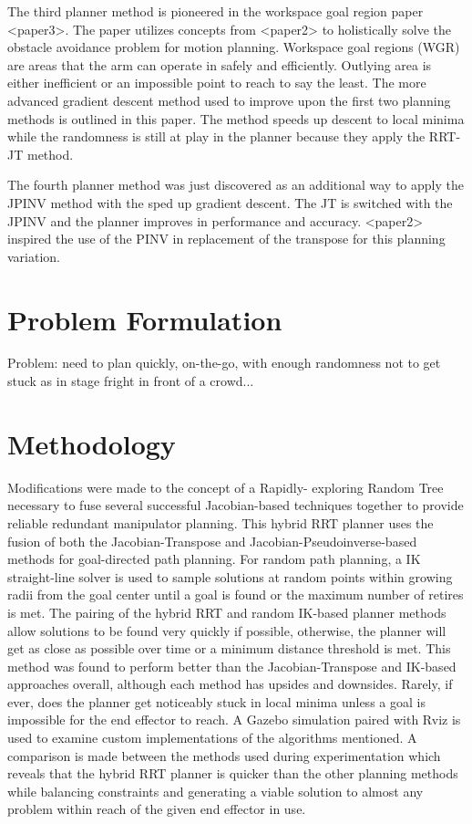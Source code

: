 \documentclass[conference]{IEEEtran} \usepackage[T1]{fontenc} \usepackage[backend=biber, style=ieee]{biblatex}
\begin{document}
The third planner method is pioneered in the workspace goal region paper <paper3>. The paper utilizes concepts from <paper2> to holistically solve the obstacle
avoidance problem for motion planning. Workspace goal regions (WGR) are areas that the arm can operate in safely and efficiently. Outlying area is either 
inefficient or an impossible point to reach to say the least. The more advanced gradient descent method used to improve upon the first two planning methods is outlined in this paper. The method speeds up descent to local minima while the randomness is still at play in the planner because they apply the RRT-JT method.  

The fourth planner method was just discovered as an additional way to apply the JPINV method with the sped up gradient descent. The JT is switched with the 
JPINV and the planner improves in performance and accuracy. <paper2> inspired the use of the PINV in replacement of the transpose for this planning variation.

\section{Problem Formulation} \label{Problem Formulation}

Problem: need to plan quickly, on-the-go, with enough randomness not to get stuck as in stage fright in front of a crowd...

\section{Methodology} \label{Methodology}

Modifications were made to the concept of a Rapidly-
exploring Random Tree necessary to fuse several successful Jacobian-based techniques together to provide reliable redundant manipulator planning. This hybrid 
RRT planner uses the fusion of both the Jacobian-Transpose and Jacobian-Pseudoinverse-based methods for goal-directed path planning. For random path planning, a IK straight-line solver is used to 
sample solutions at random points within growing radii from the goal center until a goal is found or the maximum number of retires is met. The pairing of the 
hybrid RRT and random IK-based planner methods allow solutions to be found very quickly if possible, otherwise, the planner will get as close as possible over 
time or a minimum distance threshold is met. This method was found to perform better than the Jacobian-Transpose and IK-based approaches overall, although each 
method has upsides and downsides. Rarely, if ever, does the planner get noticeably stuck in local minima unless a goal is impossible for the end effector to 
reach. A Gazebo simulation paired with Rviz is used to examine custom implementations of the algorithms mentioned. A comparison is made between the methods used 
during experimentation which reveals that the hybrid RRT planner is quicker than the other planning methods while balancing constraints and generating a viable solution to almost any problem within reach of the given end effector in use.
\end{document}
